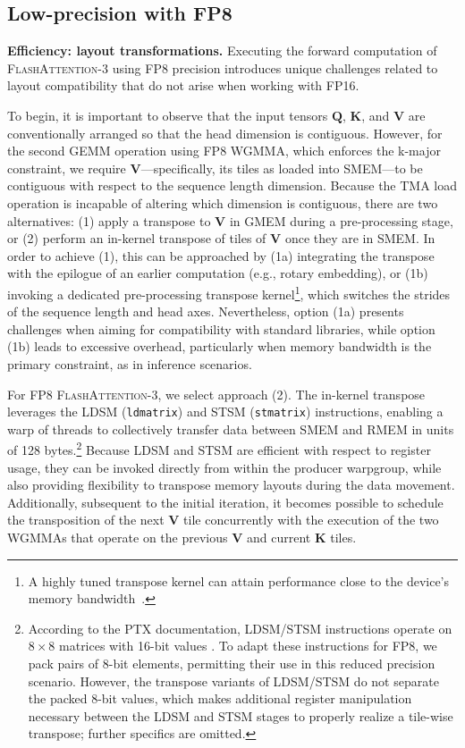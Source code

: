 \subsection{Low-precision with FP8}
\label{sec:algofp8}

\textbf{Efficiency: layout transformations.} Executing the forward computation of \textsc{FlashAttention-3} using FP8 precision introduces unique challenges related to layout compatibility that do not arise when working with FP16.

To begin, it is important to observe that the input tensors $\mathbf{Q}$, $\mathbf{K}$, and $\mathbf{V}$ are conventionally arranged so that the head dimension is contiguous. However, for the second GEMM operation using FP8 WGMMA, which enforces the k-major constraint, we require $\mathbf{V}$—specifically, its tiles as loaded into SMEM—to be contiguous with respect to the sequence length dimension. Because the TMA load operation is incapable of altering which dimension is contiguous, there are two alternatives: (1) apply a transpose to $\mathbf{V}$ in GMEM during a pre-processing stage, or (2) perform an in-kernel transpose of tiles of $\mathbf{V}$ once they are in SMEM. In order to achieve (1), this can be approached by (1a) integrating the transpose with the epilogue of an earlier computation (e.g., rotary embedding), or (1b) invoking a dedicated pre-processing transpose kernel\footnote{A highly tuned transpose kernel can attain performance close to the device’s memory bandwidth~\citep{colfax_cutlass_transpose_2024}.}, which switches the strides of the sequence length and head axes. Nevertheless, option (1a) presents challenges when aiming for compatibility with standard libraries, while option (1b) leads to excessive overhead, particularly when memory bandwidth is the primary constraint, as in inference scenarios.

For FP8 \textsc{FlashAttention-3}, we select approach (2). The in-kernel transpose leverages the LDSM (\verb|ldmatrix|) and STSM (\verb|stmatrix|) instructions, enabling a warp of threads to collectively transfer data between SMEM and RMEM in units of 128 bytes.\footnote{According to the PTX documentation, LDSM/STSM instructions operate on $8 \times 8$ matrices with 16-bit values \cite[\S 9.7.13.4.15-16]{ptx}. To adapt these instructions for FP8, we pack pairs of 8-bit elements, permitting their use in this reduced precision scenario. However, the transpose variants of LDSM/STSM do not separate the packed 8-bit values, which makes additional register manipulation necessary between the LDSM and STSM stages to properly realize a tile-wise transpose; further specifics are omitted.} Because LDSM and STSM are efficient with respect to register usage, they can be invoked directly from within the producer warpgroup, while also providing flexibility to transpose memory layouts during the data movement. Additionally, subsequent to the initial iteration, it becomes possible to schedule the transposition of the next $\mathbf{V}$ tile concurrently with the execution of the two WGMMAs that operate on the previous $\mathbf{V}$ and current $\mathbf{K}$ tiles.

